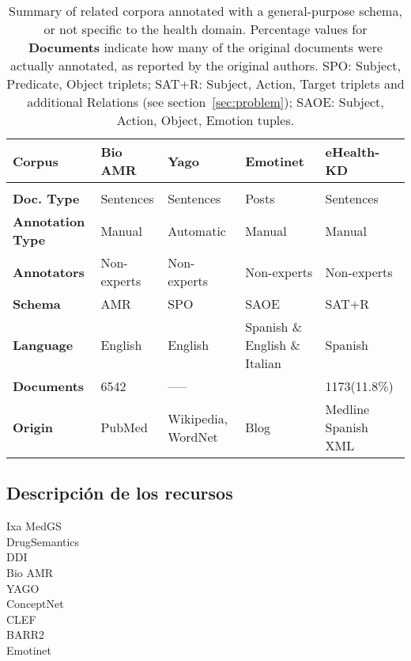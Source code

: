     \begin{table}[h!]\centering
    \footnotesize{
    \begin{tabularx}{\hsize}{X|XXXX}
        \hline
        \hline
      \textbf{Corpus} & \textbf{Bio AMR} & \textbf{Yago} & \textbf{Emotinet} & \textbf{eHealth-KD} \\
        \hline \\
      \textbf{Doc. Type} & Sentences & Sentences & Posts & Sentences\\
        \textbf{Annotation Type} & Manual & Automatic & Manual & Manual \\
        \textbf{Annotators} & Non-experts & Non-experts & Non-experts & Non-experts \\
        \textbf{Schema} & AMR & {SPO} & {SAOE} & {SAT+R} \\ %
        \textbf{Language} & English & English & Spanish \& English \& Italian & Spanish \\
        \textbf{Documents}  & 6542 &  ----- &  & 1173(11.8\%) \\
        \textbf{Origin} & PubMed & Wikipedia, WordNet & Blog & Medline Spanish XML\\
        \hline
        \hline
    \end{tabularx}
    }
    \caption{Summary of related corpora annotated with a general-purpose schema, or not specific to the health domain.
    {Percentage values for \textbf{Documents} indicate how many of the original documents were actually annotated, as reported by the original authors. SPO: Subject, Predicate, Object triplets; SAT+R: Subject, Action, Target triplets and additional Relations (see section~\ref{sec:problem}); SAOE:  Subject, Action, Object, Emotion tuples.}%
    \label{tab:stateofart2}}
    \end{table}

    \subsection{Descripción de los recursos}

    \begin{description}
      \item[Ixa MedGS]
      \item[DrugSemantics]
      \item[DDI]
      \item[Bio AMR]
      \item[YAGO]
      \item[ConceptNet]
      \item[CLEF]
      \item[BARR2]
      \item[Emotinet]
    \end{description}


